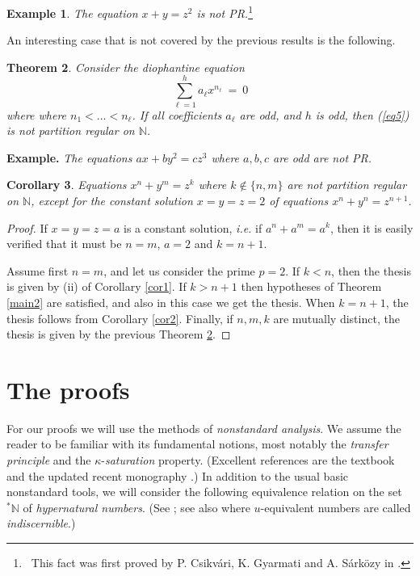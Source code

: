 \documentclass[11pt]{amsart}
\newtheorem{theorem}{Theorem}[section]
\newtheorem{corollary}[theorem]{Corollary}
\theoremstyle{definition}
\newtheorem{example}[theorem]{Example}
\theoremstyle{remark}
\numberwithin{equation}{section}
\begin{document}
\begin{example}
\emph{The equation $x+y=z^2$ is not PR.}\footnote
{~This fact was first proved by 
P. Csikv\'ari, K. Gyarmati and A. S\'ark\"{o}zy in \cite{CGS12}.} 
\end{example}

\smallskip
An interesting case that is not covered 
by the previous results is the following.

\begin{theorem}\label{main4}
Consider the diophantine equation
\begin{equation}\label{eq5}
\sum_{\ell=1}^h a_\ell x^{n_\ell}\ =\ 0
\end{equation}
where where $n_1<\ldots<n_\ell$.
If all coefficients $a_\ell$ are odd, and $h$ is odd,
then (\ref{eq5}) is not partition regular on ${\mathbb{N}}$.
\end{theorem}

\smallskip
\noindent
\textbf{Example.}
\emph{The equations $ax+by^2=cz^3$ where $a,b,c$ are odd
are not PR.}

\begin{corollary}\label{cor3}
Equations $x^n+y^m=z^k$ where $k\notin\{n,m\}$
are not partition regular on ${\mathbb{N}}$,
except for the constant solution $x=y=z=2$
of equations $x^n+y^n=z^{n+1}$.
\end{corollary}

\begin{proof}
If $x=y=z=a$ is a constant solution,
\emph{i.e.} if $a^n+a^m=a^k$, then it is easily
verified that it must be $n=m$, $a=2$ and $k=n+1$.

Assume first $n=m$, and let us consider the prime $p=2$.
If $k<n$, then the thesis is given by (ii) of Corollary \ref{cor1}.
If $k>n+1$ then hypotheses 
of Theorem \ref{main2} are satisfied, and also
in this case we get the thesis.
When $k=n+1$, the thesis follows from Corollary \ref{cor2}.
Finally, if $n,m,k$ are mutually distinct, the thesis is given by
the previous Theorem \ref{main4}.
\end{proof}

\section{The proofs}
For our proofs we will use the methods of \emph{nonstandard analysis}.
We assume the reader to be familiar with its fundamental
notions, most notably the \emph{transfer principle}
and the $\kappa$-\emph{saturation} property.
(Excellent references are the textbook \cite{G98} and
the updated recent monography \cite{LW15}.)
In addition to the usual basic nonstandard tools,
we will consider the following
equivalence relation on the set ${{{}^*{\mathbb{N}}}}$ of 
\emph{hypernatural numbers}. (See \cite{DN15}; see also
\cite{DN15sns} where $u$-equivalent numbers are called \emph{indiscernible}.)
\end{document}
